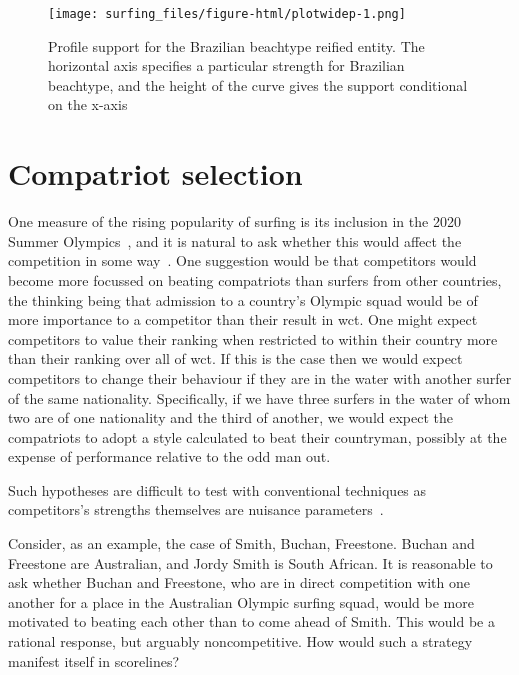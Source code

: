 \documentclass{article}
\begin{document}
\begin{figure}
  \texttt{[image: surfing\_files/figure-html/plotwidep-1.png]}
\caption{Profile support \label{brazilian_beachtype_support} for the
  Brazilian beachtype reified entity.  The horizontal axis specifies a
  particular strength for Brazilian beachtype, and the height of the
  curve gives the support conditional on the x-axis}
\end{figure}

\section{Compatriot selection}

One measure of the rising popularity of surfing is its inclusion in
the 2020 Summer Olympics~\cite{tulloch2019}, and it is natural to ask
whether this would affect the competition in some way~\cite{ho2021}.
One suggestion would be that competitors would become more focussed on
beating compatriots than surfers from other countries, the thinking
being that admission to a country's Olympic squad would be of more
importance to a competitor than their result in wct.  One might expect
competitors to value their ranking when restricted to within their
country more than their ranking over all of wct.  If this is the case
then we would expect competitors to change their behaviour if they are
in the water with another surfer of the same nationality.
Specifically, if we have three surfers in the water of whom two are of
one nationality and the third of another, we would expect the
compatriots to adopt a style calculated to beat their countryman,
possibly at the expense of performance relative to the odd man out.

Such hypotheses
are difficult to test with conventional techniques as competitors's
strengths themselves are nuisance parameters~\cite{basu1977}.

Consider, as an example, the case of Smith, Buchan, Freestone.  Buchan
and Freestone are Australian, and Jordy Smith is South African.  It is
reasonable to ask whether Buchan and Freestone, who are in direct
competition with one another for a place in the Australian Olympic
surfing squad, would be more motivated to beating each other than to
come ahead of Smith.  This would be a rational response, but arguably
noncompetitive.  How would such a strategy manifest itself in
scorelines?
\end{document}
